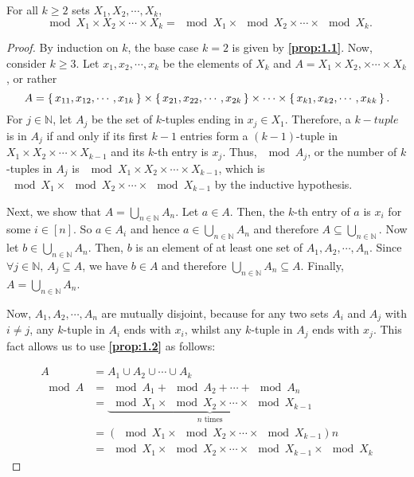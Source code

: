 \documentclass[a4paper]{article}
\begin{document}
	\begin{proposition}\label{prop:1.3}
		For all $k \geq 2$ sets $X_1, X_2, \cdots, X_k$, \[\mod{X_1 \times X_2 \times \cdots \times X_k} = \mod{X_1} \times \mod{X_2} \times \cdots \times \mod{X_k}.\]
	\end{proposition}
	
	
	
	\begin{proof}
		By induction on $k$, the base case $k=2$ is given by \textbf{\autoref{prop:1.1}}. Now, consider $k\geq3$. Let $x_1, x_2,\cdots,x_k$ be the elements of $X_k$ and $A= X_1 \times X_2, \times \cdots \times X_k$, or rather \[A = \set{x_{11}, x_{12}, \cdots, x_{1k}} \times \set{x_{21}, x_{22}, \cdots, x_{2k}} \times \cdots \times \set{x_{k1}, x_{k2}, \cdots, x_{kk}}.\] For $j \in \mathbb N$, let $A_j$ be the set of $k$-tuples ending in $x_j\in X_1$.  Therefore, a $k-tuple$ is in $A_j$ if and only if its first $k-1$ entries form a $(k-1)$-tuple in $X_1 \times X_2 \times \cdots \times X_{k-1}$ and its $k$-th entry is $x_j$. Thus, $\mod{A_j}$, or the number of $k$-tuples in $A_j$ is $\mod{X_1 \times X_2 \times \cdots \times X_{k-1}}$, which is $\mod{X_1} \times \mod{X_2} \times \cdots \times \mod{X_{k-1}}$ by the inductive hypothesis. 
		
		Next, we show that $A = \bigcup_{n\in\mathbb N}A_n$. Let $a\in A$. Then, the $k$-th entry of $a$ is $x_i$ for some $i \in [n]$. So $a\in A_i$ and hence $a \in \bigcup_{n\in\mathbb N}A_n$ and therefore $A \subseteq \bigcup_{n\in\mathbb N}$. Now let $b \in \bigcup_{n\in\mathbb N} A_n$. Then, $b$ is an element of at least one set of $A_1, A_2, \cdots, A_n$. Since $\forall j\in\mathbb N,\, A_j \subseteq A$, we have $b \in A$ and therefore $\bigcup_{n\in\mathbb N}A_n \subseteq A$. Finally, $A = \bigcup_{n\in\mathbb N} A_n$.
		
		Now, $A_1, A_2, \cdots, A_n$ are mutually disjoint, because for any two sets $A_i$ and $A_j$ with $i\neq j$, any $k$-tuple in $A_i$ ends with $x_i$, whilst any $k$-tuple in $A_j$ ends with $x_j$. This fact allows us to use \textbf{\autoref{prop:1.2}} as follows:
		
		\begin{align*}
			A &= A_1 \cup A_2 \cup \cdots \cup A_k\\
			\mod A & = \mod{A_1} + \mod{A_2} + \cdots + \mod{A_n}                                                   \\
			& = \underbrace{\mod{X_1} \times \mod{X_2} \times \cdots \times \mod{X_{k-1}}}_{n \text{ times}} \\
			& = \left(\mod{X_1} \times \mod{X_2} \times \cdots \times \mod{X_{k-1}}\right)n                  \\
			& = \mod{X_1} \times \mod{X_2} \times \cdots \times \mod{X_{k-1}} \times \mod{X_k}               
		\end{align*}
	\end{proof}
	
\end{document}
